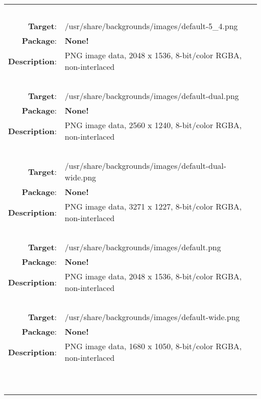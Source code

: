 \begin{longtable}{rl}
\hline
\multicolumn{2}{l}{\ }\\
\textbf{Target}: & /usr/share/backgrounds/images/default-5\_4.png\\
\textbf{Package}: & \textbf{None!}\\
\textbf{Description}: & PNG image data, 2048 x 1536, 8-bit/color RGBA, non-interlaced\\
\multicolumn{2}{l}{\ }\\
\textbf{Target}: & /usr/share/backgrounds/images/default-dual.png\\
\textbf{Package}: & \textbf{None!}\\
\textbf{Description}: & PNG image data, 2560 x 1240, 8-bit/color RGBA, non-interlaced\\
\multicolumn{2}{l}{\ }\\
\textbf{Target}: & /usr/share/backgrounds/images/default-dual-wide.png\\
\textbf{Package}: & \textbf{None!}\\
\textbf{Description}: & PNG image data, 3271 x 1227, 8-bit/color RGBA, non-interlaced\\
\multicolumn{2}{l}{\ }\\
\textbf{Target}: & /usr/share/backgrounds/images/default.png\\
\textbf{Package}: & \textbf{None!}\\
\textbf{Description}: & PNG image data, 2048 x 1536, 8-bit/color RGBA, non-interlaced\\
\multicolumn{2}{l}{\ }\\
\textbf{Target}: & /usr/share/backgrounds/images/default-wide.png\\
\textbf{Package}: & \textbf{None!}\\
\textbf{Description}: & PNG image data, 1680 x 1050, 8-bit/color RGBA, non-interlaced\\
\multicolumn{2}{l}{\ }\\
\hline
\multicolumn{2}{l}{\ }\\
\end{longtable}
